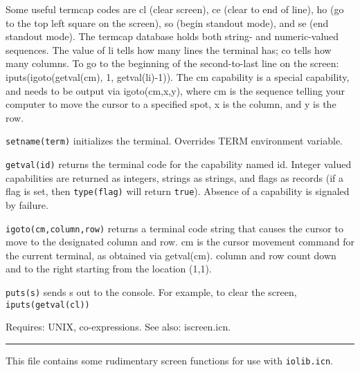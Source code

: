 Some useful termcap codes are {\textquotedbl}cl{\textquotedbl} (clear
screen), {\textquotedbl}ce{\textquotedbl} (clear to end of line),
{\textquotedbl}ho{\textquotedbl} (go to the top left square on the
screen), {\textquotedbl}so{\textquotedbl} (begin standout mode), and
{\textquotedbl}se{\textquotedbl} (end standout mode). The termcap
database holds both string- and numeric-valued sequences. The value
of {\textquotedbl}li{\textquotedbl} tells how many
lines the terminal has; {\textquotedbl}co{\textquotedbl} tells how
many columns. To go to the beginning of the second-to-last line on the
screen: iputs(igoto(getval({\textquotedbl}cm{\textquotedbl}), 1,
getval({\textquotedbl}li{\textquotedbl})-1)). The
{\textquotedbl}cm{\textquotedbl} capability is a special capability,
and needs to be output via igoto(cm,x,y), where cm is the sequence
telling your computer to move the cursor to a specified spot, x is the
column, and y is the row.

\texttt{setname(term)} initializes the terminal. Overrides
TERM environment variable.

\texttt{getval(id)} returns the terminal code for the capability named
id. Integer valued capabilities are returned as integers, strings as
strings, and flags as records (if a flag is set, then
\texttt{type(flag)} will return
\texttt{{\textquotedbl}true{\textquotedbl}}). Absence of a capability
is signaled by failure.

\texttt{igoto(cm,column,row)} returns a terminal code string that causes
the cursor to move to the designated column and row. cm is the cursor
movement command for the current terminal, as obtained via
getval({\textquotedbl}cm{\textquotedbl}). column and row count down and
to the right starting from the location (1,1).

\texttt{puts(s)} sends s out to the console. For example, to clear the
screen, \texttt{iputs(getval({\textquotedbl}cl{\textquotedbl}))}

Requires: UNIX, co-expressions. See also: iscreen.icn.

\vspace{0.25cm}\hrule{}

This file contains some rudimentary screen functions for use with
\texttt{iolib.icn}.

